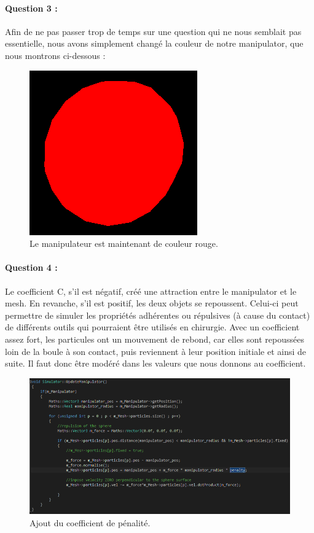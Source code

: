 \documentclass[a4paper,12pt]{article}
\begin{document}
\paragraph{Question 3 :} Afin de ne pas passer trop de temps sur une question qui ne nous semblait pas essentielle, nous avons simplement changé la couleur de notre manipulator, que nous montrons ci-dessous :
\begin{figure}
  \centering
  \includegraphics{images/manipulateur.png}
  \caption{Le manipulateur est maintenant de couleur rouge.}
  \label{fig:}
\end{figure}


\paragraph{Question 4 :} Le coefficient C, s'il est négatif, créé une attraction entre le manipulator et le mesh. En revanche, s'il est positif, les deux objets se repoussent. Celui-ci peut permettre de simuler les propriétés adhérentes ou répulsives (à cause du contact) de différents outils qui pourraient être utilisés en chirurgie. Avec un coefficient assez fort, les particules ont un mouvement de rebond, car elles sont repoussées loin de la boule à son contact, puis reviennent à leur position initiale et ainsi de suite. Il faut donc être modéré dans les valeurs que nous donnons au coefficient.
\begin{figure}
  \centering
  \includegraphics{images/penalty.png}
  \caption{Ajout du coefficient de pénalité.}
  \label{fig:q4tp2}
\end{figure}
\end{document}
